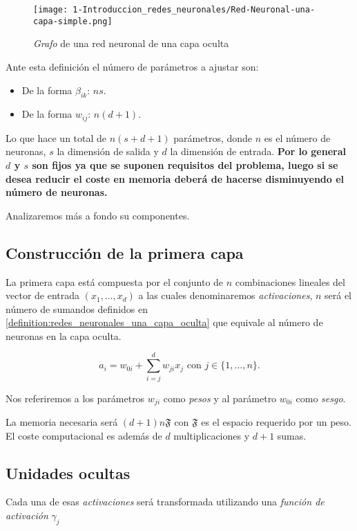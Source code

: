 \begin{figure}[h!]
    \centering
    \texttt{[image: 1-Introduccion\_redes\_neuronales/Red-Neuronal-una-capa-simple.png]}
    \caption{\textit{Grafo} de una red neuronal de una capa oculta}
    \label{img:grafo-red-neuronal-una-capa-oculta_repeticion}
\end{figure}

Ante esta definición el número de parámetros a ajustar son: 
\begin{itemize}
    \item De la forma $\beta_{i k}$: $n s$. 
    \item De la forma $w_{i j}$: $n(d+1)$.
\end{itemize}
Lo que hace un total de $n(s+d+1)$ parámetros, donde $n$ es el número de neuronas, $s$ la dimensión de salida y $d$ la dimensión de entrada. 
\textbf{Por lo general $d$ y $s$ son fijos ya que se suponen requisitos del problema, luego si se desea reducir el coste en memoria deberá de hacerse disminuyendo el número de neuronas.}

Analizaremos más a fondo su componentes. 

\subsection*{Construcción de la primera capa}
La primera capa está compuesta por el conjunto de $n$ combinaciones
lineales del vector de entrada $(x_1, \ldots, x_d)$
a las cuales denominaremos \textit{activaciones}, $n$ será el número de sumandos definidos en \ref{definition:redes_neuronales_una_capa_oculta}  que equivale al número de neuronas en la capa oculta. 

\begin{equation}
    a_i = w_{0 i} + \sum_{i=j}^d w_{j i} x_j 
    \text{ con } j \in \{1, \ldots, n \}.
\end{equation}

Nos referiremos a los  parámetros $w_{j i}$ como 
\textit{pesos} y al parámetro $w_{0 i}$ como 
\textit{sesgo}.  

La memoria necesaria será $(d+1)n \mathfrak{F}$ 
con $\mathfrak{F}$ es el espacio requerido por un peso. 
El coste computacional es además de $d$ multiplicaciones 
y $d+1$ sumas.

\subsection*{Unidades ocultas}
Cada una de esas \textit{activaciones} será transformada
utilizando una \textit{función de activación} $\gamma_j$ 

